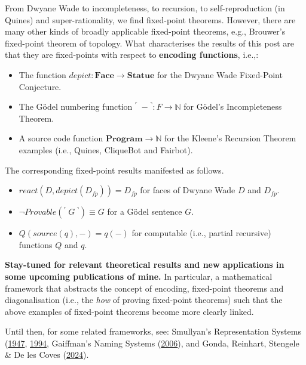 From Dwyane Wade to incompleteness, to recursion, to self-reproduction (in Quines) and super-rationality, we find fixed-point theorems. However, there are many other kinds of broadly applicable fixed-point theorems, e.g., Brouwer's fixed-point theorem of topology. What characterises the results of this post are that they are fixed-points with respect to \textbf{encoding functions}, i.e.,:
\begin{itemize}
    \item The function $depict: \textbf{Face} \rightarrow \textbf{Statue}$ for the Dwyane Wade Fixed-Point Conjecture.
    \item The Gödel numbering function ${}^\ulcorner\ - {}^\urcorner: F \rightarrow \mathbb{N}$ for Gödel's Incompleteness Theorem.
    \item A source code function $\textbf{Program} \rightarrow \mathbb{N}$ for the Kleene's Recursion Theorem examples (i.e., Quines, CliqueBot and Fairbot).
\end{itemize}

The corresponding fixed-point results manifested as follows.
\begin{itemize}
    \item $react(D, depict(D_{fp})) = D_{fp}$ for faces of Dwyane Wade $D$ and $D_{fp}$.
    \item $\neg Provable({}^\ulcorner\ G\ {}^\urcorner) \equiv G$ for a Gödel sentence $G$.
    \item $Q(source(q), -) = q(-)$ for computable (i.e., partial recursive) functions $Q$ and $q$.
\end{itemize}

\textbf{Stay-tuned for relevant theoretical results and new applications in some upcoming publications of mine.} In particular, a mathematical framework that abstracts the concept of encoding, fixed-point theorems and diagonalisation (i.e., the \textit{how} of proving fixed-point theorems) such that the above examples of fixed-point theorems become more clearly linked.

Until then, for some related frameworks, see: Smullyan's Representation Systems (\href{https://www.jstor.org/stable/j.ctt1b7x7ww}{1947}, \href{https://academic.oup.com/book/54024?login=false}{1994}, Gaiffman's Naming Systems (\href{https://haimgaifman.net/wp-content/uploads/2016/07/22odel-to-kleene.pdf}{2006}), and Gonda, Reinhart, Stengele \& De les Coves (\href{https://compositionality.episciences.org/14134}{2024}).